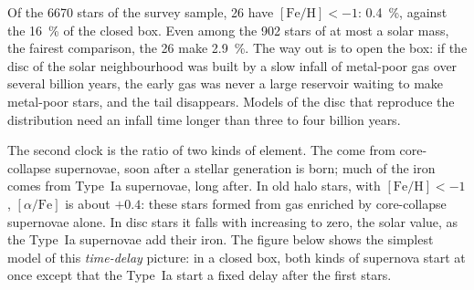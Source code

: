Of the 6670 stars of the survey sample, 26 have $[\mathrm{Fe/H}] < -1$:
\qty{0.4}{\percent}, against the \qty{16}{\percent} of the closed box.
Even among the 902 stars of at most a solar mass, the fairest
comparison, the 26 make \qty{2.9}{\percent}. The way out is to open the
box: if the disc of the solar neighbourhood was built by a slow infall
of metal-poor gas over several billion years, the early gas was never
a large reservoir waiting to make metal-poor stars, and the tail
disappears. Models of the disc that reproduce the distribution need an
infall time longer than three to four billion years.

The second clock is the ratio of two kinds of element. The  come from core-collapse supernovae, soon after a stellar
generation is born; much of the iron comes from Type~Ia supernovae,
long after. In old halo stars, with $[\mathrm{Fe/H}] < -1$,
$[\alpha/\mathrm{Fe}]$ is about $+0.4$: these stars formed from gas
enriched by core-collapse supernovae alone. In disc stars it falls with
increasing  to zero, the solar value, as the Type~Ia
supernovae add their iron. The figure below shows the simplest model
of this \emph{time-delay} picture: in a closed box, both kinds of
supernova start at once except that the Type~Ia start a fixed delay
after the first stars.

